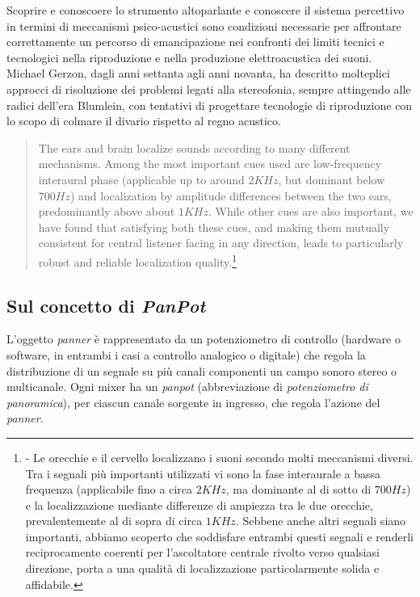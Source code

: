 Scoprire e conoscoere lo strumento altoparlante e conoscere il sistema percettivo
in termini di meccanismi psico-acustici sono condizioni necessarie per
affrontare correttamente un percorso di emancipazione nei confronti dei limiti
tecnici e tecnologici nella riproduzione e nella produzione elettroacustica dei suoni.
Michael Gerzon, dagli anni settanta agli anni novanta, ha descritto molteplici
approcci di risoluzione dei problemi legati alla stereofonia, sempre attingendo
alle radici dell'era Blumlein, con tentativi di progettare tecnologie di
riproduzione con lo scopo di colmare il divario rispetto al regno acustico.

\begin{quote}
The ears and brain localize sounds according to many different mechanisms. Among
the most important cues used are low-frequency interaural phase (applicable up
to around $2KHz$, but dominant below $700Hz$) and localization by
amplitude differences between the two ears, predominantly above about
$1KHz$. While other cues are also important, we have found that satisfying
both these cues, and making them mutually consistent for central listener facing
in any direction, leads to particularly robust and reliable localization
quality.\footnote{\cite{mg92pdmsss} - Le orecchie e il cervello localizzano i
suoni secondo molti meccanismi diversi. Tra i segnali più importanti utilizzati
vi sono la fase interaurale a bassa frequenza (applicabile fino a circa $2KHz$,
ma dominante al di sotto di $700Hz$) e la localizzazione mediante
differenze di ampiezza tra le due orecchie, prevalentemente al di sopra di
circa $1KHz$. Sebbene anche altri segnali siano importanti, abbiamo
scoperto che soddisfare entrambi questi segnali e renderli reciprocamente
coerenti per l'ascoltatore centrale rivolto verso qualsiasi direzione, porta
a una qualità di localizzazione particolarmente solida e affidabile.}
\end{quote}

\subsection{Sul concetto di \emph{PanPot}}
\label{sec:panpot}

L'oggetto \emph{panner} è rappresentato da un potenziometro di controllo
(hardware o software, in entrambi i casi a controllo analogico o digitale) che
regola la distribuzione di un segnale su più canali componenti un campo sonoro
stereo o multicanale. Ogni mixer ha un \emph{panpot} (abbreviazione di
\emph{potenziometro di panoramica}), per ciascun canale sorgente in ingresso,
che regola l'azione del \emph{panner}.

